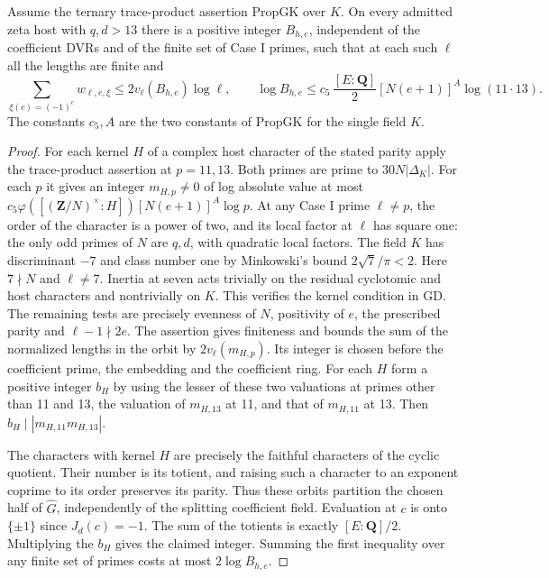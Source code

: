 \begin{proposition}\label{zetaring:integer}
Assume the ternary trace-product assertion \(\mathrm{PropGK}\)
over \(K\). On every admitted zeta host with \(q,d>13\) there is a
positive integer \(B_{h,e}\), independent of the coefficient DVRs
and of the finite set of Case I primes, such that at each such \(\ell\)
all the lengths are finite and
\[
 \sum_{\xi(c)=(-1)^e}w_{\ell,e,\xi}
 \le 2v_\ell(B_{h,e})\log\ell,\qquad
 \log B_{h,e}\le c_5\,\frac{[E:\mathbf Q]}2
       [N(e+1)]^A\log(11\cdot13).
\]
The constants \(c_5,A\) are the two constants of \(\mathrm{PropGK}\)
for the single field \(K\).
\end{proposition}
\begin{proof}
For each kernel \(H\) of a complex host character of the stated
parity apply the trace-product assertion at \(p=11,13\). Both primes
are prime to \(30N|\Delta_K|\). For each \(p\) it gives an integer
\(m_{H,p}\ne0\) of log absolute value at most
\(c_5\varphi([(\mathbf Z/N)^\times:H])[N(e+1)]^A\log p\).
At any Case I prime \(\ell\ne p\), the order of the character is
a power of two, and its local factor at \(\ell\) has square one:
the only odd primes of \(N\) are \(q,d\), with quadratic local
factors. The field \(K\) has discriminant \(-7\) and class number
one by Minkowski's bound \(2\sqrt7/\pi<2\). Here \(7\nmid N\)
and \(\ell\ne7\). Inertia at seven acts trivially on the residual
cyclotomic and host characters and nontrivially on \(K\).
This verifies the kernel condition in \(\mathrm{GD}\).
The remaining tests are precisely evenness of \(N\), positivity
of \(e\), the prescribed parity and \(\ell-1\nmid2e\). The assertion
gives finiteness and bounds the sum of the normalized lengths in
the orbit by \(2v_\ell(m_{H,p})\). Its integer is chosen before
the coefficient prime, the embedding and the coefficient ring.
For each \(H\) form a positive integer \(b_H\) by using the lesser
of these two valuations at primes other than 11 and 13, the valuation
of \(m_{H,13}\) at 11, and that of \(m_{H,11}\) at 13.
Then \(b_H\mid |m_{H,11}m_{H,13}|\).

The characters with kernel \(H\) are precisely the faithful
characters of the cyclic quotient. Their number is its totient,
and raising such a character to an exponent coprime to its order
preserves its parity. Thus these orbits partition the chosen half
of \(\widehat G\), independently of the splitting coefficient field.
Evaluation at \(c\) is onto \(\{\pm1\}\) since \(J_d(c)=-1\).
The sum of the totients is exactly \([E:\mathbf Q]/2\).
Multiplying the \(b_H\) gives the claimed integer. Summing the
first inequality over any finite set of primes costs at most
\(2\log B_{h,e}\).
\end{proof}

